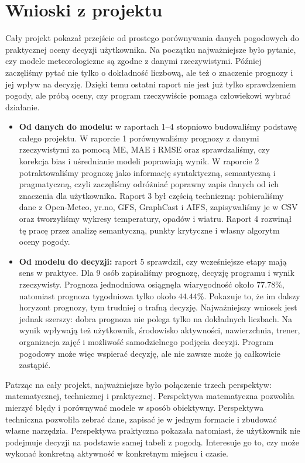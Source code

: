 \documentclass[a4paper,12pt]{article}
\begin{document}
\newpage
\section{Wnioski z projektu}

Cały projekt pokazał przejście od prostego porównywania danych pogodowych do
praktycznej oceny decyzji użytkownika. Na początku najważniejsze było pytanie,
czy modele meteorologiczne są zgodne z danymi rzeczywistymi. Później zaczęliśmy
pytać nie tylko o dokładność liczbową, ale też o znaczenie prognozy i jej wpływ
na decyzję. Dzięki temu ostatni raport nie jest już tylko sprawdzeniem pogody,
ale próbą oceny, czy program rzeczywiście pomaga człowiekowi wybrać działanie.

\begin{itemize}
    \item \textbf{Od danych do modelu:} w raportach 1--4 stopniowo budowaliśmy
    podstawę całego projektu. W raporcie 1 porównywaliśmy prognozy z danymi
    rzeczywistymi za pomocą ME, MAE i RMSE oraz sprawdzaliśmy, czy korekcja bias
    i uśrednianie modeli poprawiają wynik. W raporcie 2 potraktowaliśmy prognozę
    jako informację syntaktyczną, semantyczną i pragmatyczną, czyli zaczęliśmy
    odróżniać poprawny zapis danych od ich znaczenia dla użytkownika. Raport 3
    był częścią techniczną: pobieraliśmy dane z Open-Meteo, yr.no, GFS,
    GraphCast i AIFS, zapisywaliśmy je w CSV oraz tworzyliśmy wykresy
    temperatury, opadów i wiatru. Raport 4 rozwinął tę pracę przez analizę
    semantyczną, punkty krytyczne i własny algorytm oceny pogody.

    \item \textbf{Od modelu do decyzji:} raport 5 sprawdził, czy wcześniejsze
    etapy mają sens w praktyce. Dla 9 osób zapisaliśmy prognozę, decyzję programu
    i wynik rzeczywisty. Prognoza jednodniowa osiągnęła wiarygodność około
    $77.78\%$, natomiast prognoza tygodniowa tylko około $44.44\%$. Pokazuje to,
    że im dalszy horyzont prognozy, tym trudniej o trafną decyzję. Najważniejszy
    wniosek jest jednak szerszy: dobra prognoza nie polega tylko na dokładnych
    liczbach. Na wynik wpływają też użytkownik, środowisko aktywności,
    nawierzchnia, trener, organizacja zajęć i możliwość samodzielnego podjęcia
    decyzji. Program pogodowy może więc wspierać decyzję, ale nie zawsze może ją
    całkowicie zastąpić.
\end{itemize}

\noindent
Patrząc na cały projekt, najważniejsze było połączenie trzech perspektyw:
matematycznej, technicznej i praktycznej. Perspektywa matematyczna pozwoliła
mierzyć błędy i porównywać modele w sposób obiektywny. Perspektywa techniczna
pozwoliła zebrać dane, zapisać je w jednym formacie i zbudować własne narzędzia.
Perspektywa praktyczna pokazała natomiast, że użytkownik nie podejmuje decyzji
na podstawie samej tabeli z pogodą. Interesuje go to, czy może wykonać konkretną
aktywność w konkretnym miejscu i czasie.
\end{document}
